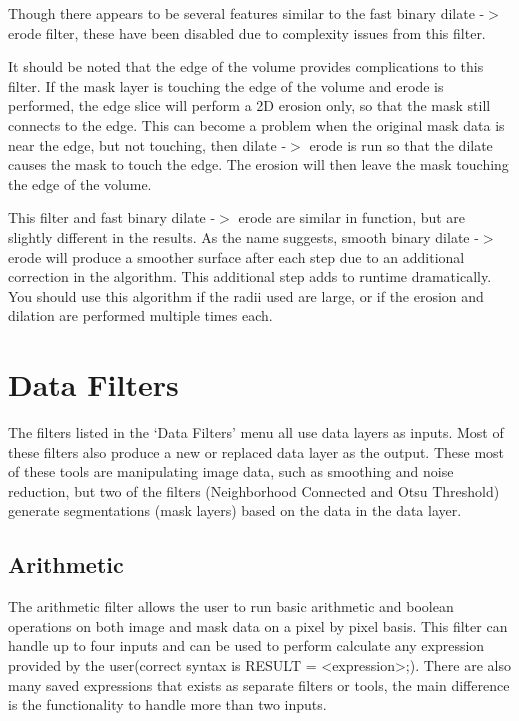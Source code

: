 \documentclass[fleqn,11pt,openany]{book}
\begin{document}
Though there appears to be several features similar to the fast binary dilate -$>$ erode filter, these have been disabled due to complexity issues from this filter.

It should be noted that the edge of the volume provides complications to this filter.  If the mask layer is touching the edge of the volume and erode is performed, the edge slice will perform a 2D erosion only, so that the mask still connects to the edge.  This can  become a problem when the original mask data is near the edge, but not touching, then dilate -$>$ erode is run so that the dilate causes the mask to touch the edge.  The erosion will then leave the mask touching the edge of the volume.

This filter and fast binary dilate -$>$ erode are similar in function, but are slightly different in the results.  As the name suggests, smooth binary dilate -$>$ erode will produce a smoother surface after each step due to an additional correction in the algorithm.  This additional step adds to runtime dramatically.  You should use this algorithm if the radii used are large, or if the erosion and dilation are performed multiple times each.  

\section{Data Filters}

The filters listed in the `Data Filters' menu all use data layers as inputs.  Most of these filters also produce a new or replaced data layer as the output.  These most of these tools are manipulating image data, such as smoothing and noise reduction, but two of the filters (Neighborhood Connected and Otsu Threshold) generate segmentations (mask layers) based on the data in the data layer.  

\subsection{Arithmetic}

The arithmetic filter allows the user to run basic arithmetic and boolean operations on both image and mask data on a pixel by pixel basis.  This filter can handle up to four inputs and can be used to perform calculate any expression provided by the user(correct syntax is RESULT = <expression>;).  There are also many saved expressions that exists as separate filters or tools, the main difference is the functionality to handle more than two inputs.
\end{document}
